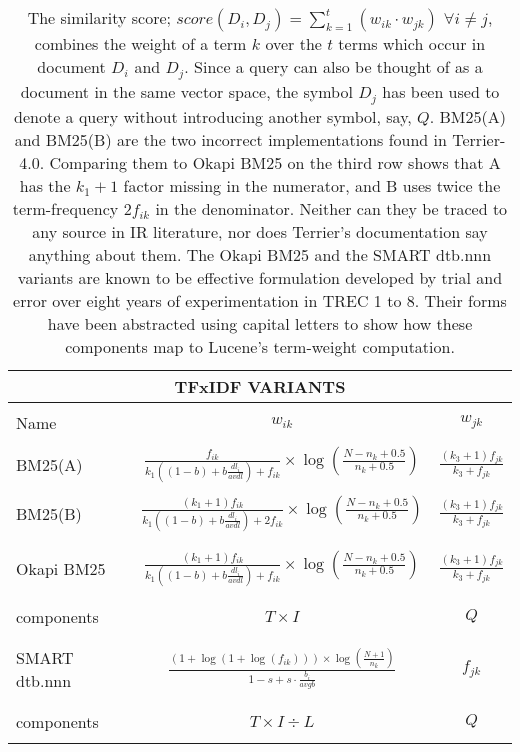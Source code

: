 \begin{table}
  \centering
  \begin{tabular}{lcc}
    \multicolumn{3}{c}{TFxIDF VARIANTS}\\
    \hline\hline
    \\
    Name & $w_{ik}$ & $w_{jk}$\\
    \hline
    \\
    BM25(A)
    & $\frac{f_{ik}}{k_{1}((1-b)+b\frac{dl_{i}}{avdl})+f_{ik}} \times \log(\frac{N-n_{k}+0.5}{n_{k}+0.5})$
    & $\frac{(k_{3}+1)f_{jk}}{k_{3}+f_{jk}}$ \\
    \\
    BM25(B)
    & $\frac{(k_{1}+1)f_{ik}}{k_{1}((1-b)+b\frac{dl_{i}}{avdl})+2f_{ik}} \times \log(\frac{N-n_{k}+0.5}{n_{k}+0.5})$
    & $\frac{(k_{3}+1)f_{jk}}{k_{3}+f_{jk}}$ \\
    \\\hline
    \\
    Okapi BM25
    & $\frac{(k_{1}+1)f_{ik}}{k_{1}((1-b)+b\frac{dl_{i}}{avdl})+f_{ik}} \times \log(\frac{N-n_{k}+0.5}{n_{k}+0.5})$
    & $\frac{(k_{3}+1)f_{jk}}{k_{3}+f_{jk}}$ \\
    \\\\
    components & $T \times I$ & $Q$ \\
    \\\hline
    \\
    SMART dtb.nnn
    & $\frac{(1+\log(1+\log(f_{ik}))) \times \log(\frac{N+1}{n_{k}})}{1-s+s \cdot \frac{b_{i}}{avgb}}$
    & $f_{jk}$ \\
    \\\\
    components & $T \times I \div L$ & $Q$ \\
    \\\hline\hline
  \end{tabular}
  \caption{The similarity score;
    $score(D_{i},D_{j})=\sum_{k=1}^{t}(w_{ik} \cdot w_{jk})$ $\forall
    i \neq j$, combines the weight of a term $k$ over the $t$ terms
    which occur in document $D_{i}$ and $D_{j}$. Since a query can
    also be thought of as a document in the same vector space, the
    symbol $D_{j}$ has been used to denote a query without introducing
    another symbol, say, $Q$. BM25(A) and BM25(B) are the two
    incorrect implementations found in Terrier-4.0. Comparing them to
    Okapi BM25 on the third row shows that A has the $k_{1}+1$ factor
    missing in the numerator, and B uses twice the term-frequency
    $2f_{ik}$ in the denominator. Neither can they be traced to any
    source in IR literature, nor does Terrier's documentation say
    anything about them. The Okapi BM25 and the SMART dtb.nnn variants
    are known to be effective formulation developed by trial and error
    over eight years of experimentation in TREC 1 to 8. Their forms
    have been abstracted using capital letters to show how these
    components map to Lucene's term-weight computation.}
  \label{tab:tfxidf}
\end{table}

